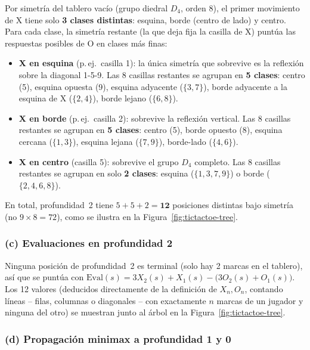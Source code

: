 \documentclass[11pt,onecolumn,letterpaper]{article}
\begin{document}
Por simetr\'ia del tablero vac\'io (grupo diedral $D_4$, orden 8), el primer movimiento de
X tiene solo \textbf{3 clases distintas}: esquina, borde (centro de lado) y centro. Para
cada clase, la simetr\'ia restante (la que deja fija la casilla de X) punt\'ua las
respuestas posibles de O en clases m\'as finas:

\begin{itemize}[leftmargin=1.4em]
\item \textbf{X en esquina} (p.\,ej.\ casilla 1): la \'unica simetr\'ia que sobrevive es la
  reflexi\'on sobre la diagonal 1-5-9. Las 8 casillas restantes se agrupan en
  \textbf{5 clases}: centro (5), esquina opuesta (9), esquina adyacente
  ($\{3,7\}$), borde adyacente a la esquina de X ($\{2,4\}$), borde lejano
  ($\{6,8\}$).
\item \textbf{X en borde} (p.\,ej.\ casilla 2): sobrevive la reflexi\'on vertical. Las 8
  casillas restantes se agrupan en \textbf{5 clases}: centro (5), borde opuesto (8),
  esquina cercana ($\{1,3\}$), esquina lejana ($\{7,9\}$), borde-lado ($\{4,6\}$).
\item \textbf{X en centro} (casilla 5): sobrevive el grupo $D_4$ completo. Las 8 casillas
  restantes se agrupan en solo \textbf{2 clases}: esquina ($\{1,3,7,9\}$) o borde
  ($\{2,4,6,8\}$).
\end{itemize}

En total, profundidad~2 tiene $5+5+2=\mathbf{12}$ posiciones distintas bajo simetr\'ia (no
$9\times8=72$), como se ilustra en la Figura~\ref{fig:tictactoe-tree}.

\subsubsection*{(c) Evaluaciones en profundidad 2}

Ninguna posici\'on de profundidad~2 es terminal (solo hay 2 marcas en el tablero), as\'i
que se punt\'ua con $\text{Eval}(s)=3X_2(s)+X_1(s)-\big(3O_2(s)+O_1(s)\big)$. Los 12 valores
(deducidos directamente de la definici\'on de $X_n,O_n$, contando l\'ineas -- filas,
columnas o diagonales -- con exactamente $n$ marcas de un jugador y ninguna del otro) se
muestran junto al \'arbol en la Figura~\ref{fig:tictactoe-tree}.

\subsubsection*{(d) Propagaci\'on minimax a profundidad 1 y 0}
\end{document}
